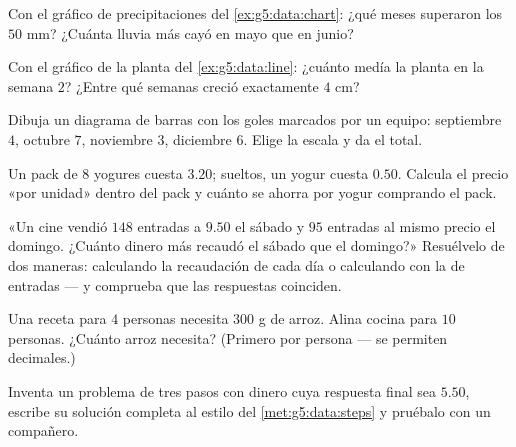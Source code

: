 \begin{exercise}[$\star$]\label{exo:g5:data:5}
Con el gráfico de precipitaciones del \cref{ex:g5:data:chart}: ¿qué meses
superaron los $50$ mm? ¿Cuánta lluvia más cayó en mayo que en
junio?
\end{exercise}

\begin{exercise}[$\star$]\label{exo:g5:data:6}
Con el gráfico de la planta del \cref{ex:g5:data:line}: ¿cuánto medía la
planta en la semana $2$? ¿Entre qué semanas creció exactamente
$4$ cm?
\end{exercise}

\begin{exercise}[$\star$]\label{exo:g5:data:7}
Dibuja un diagrama de barras con los goles marcados por un equipo:
septiembre $4$, octubre $7$, noviembre $3$, diciembre $6$. Elige la
escala y da el total.
\end{exercise}

\begin{exercise}[$\star$]\label{exo:g5:data:8}
Un pack de $8$ yogures cuesta $3.20$; sueltos, un yogur cuesta
$0.50$. Calcula el precio «por unidad» dentro del pack y cuánto se
ahorra por yogur comprando el pack.
\end{exercise}

\begin{exercise}[$\star\star$]\label{exo:g5:data:9}
«Un cine vendió $148$ entradas a $9.50$ el sábado y $95$ entradas
al mismo precio el domingo. ¿Cuánto dinero más recaudó el sábado
que el domingo?» Resuélvelo de dos maneras: calculando la recaudación de cada día o
calculando con la \emph{} de entradas --- y comprueba que
las respuestas coinciden.
\end{exercise}

\begin{exercise}[$\star\star$]\label{exo:g5:data:10}
Una receta para $4$ personas necesita $300$ g de arroz. Alina cocina para
$10$ personas. ¿Cuánto arroz necesita? (Primero por persona ---
se permiten decimales.)
\end{exercise}

\begin{exercise}[$\star\star$]\label{exo:g5:data:11}
Inventa un problema de tres pasos con dinero cuya respuesta final sea
$5.50$, escribe su solución completa al estilo del
\cref{met:g5:data:steps} y pruébalo con un compañero.
\end{exercise}
